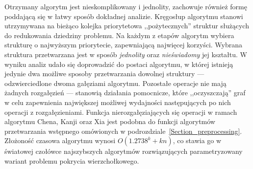 \par {
  Otrzymany algorytm jest nieskomplikowany i jednolity, zachowuje również formę poddającą się w łatwy sposób dokładnej analizie.
  Kręgosłup algorytmu stanowi utrzymywana na bieżąco kolejka priorytetowa ,,pożytecznych'' struktur służących do redukowania dziedziny problemu.
  Na każdym z etapów algorytm wybiera strukturę o najwyższym priorytecie, zapewniającą najwięcej korzyści.
  Wybrana struktura przetwarzana jest w sposób \emph{jednolity} oraz \emph{nieświadomy} jej kształtu.
  W wyniku analiz udało się doprowadzić do postaci algorytmu, w której istnieją jedynie dwa możliwe sposoby przetwarzania dowolnej struktury --- odzwierciedlone dwoma gałęziami algorytmu.
  Pozostałe operacje nie mają żadnych rozgałęzień --- stanowią działania pomocnicze, które ,,oczyszczają'' graf w celu zapewnienia największej możliwej wydajności następujących po nich operacji z rozgałęzieniami.
  Funkcja nierozgałęziających się operacji w ramach algorytmu Chena, Kanji oraz Xia jest podobna do funkcji algorytmów przetwarzania wstępnego omówionych w podrozdziale~\ref{Section_preprocessing}.\\
  Złożoność czasowa algorytmu wynosi $O(1.2738^k + kn)$, co stawia go w światowej czołówce najszybszych algorytmów rozwiązujących parametryzowany wariant problemu pokrycia wierzchołkowego.
}

